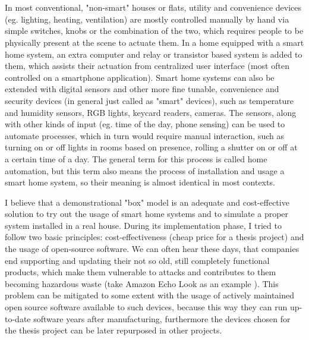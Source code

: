 \chapter{\bevezetes}

In most conventional, "non-smart" houses or flats, utility and convenience devices (eg. lighting, heating, ventilation) are mostly controlled manually by hand via simple switches, knobs or the combination of the two, which requires people to be physically present at the scene to actuate them. In a home equipped with a smart home system, an extra computer and relay or transistor based system is added to them, which assists their actuation from centralized user interface (most often controlled on a smartphone application). Smart home systems can also be extended with digital sensors and other more fine tunable, convenience and security devices (in general just called as "smart" devices), such as temperature and humidity sensors, RGB lights, keycard readers, cameras. The sensors, along with other kinds of input (eg. time of the day, phone sensing) can be used to automate processes, which in turn would require manual interaction, such as turning on or off lights in rooms based on presence, rolling a shutter on or off at a certain time of a day. The general term for this process is called home automation, but this term also means the process of installation and usage a smart home system, so their meaning is almost identical in most contexts.

I believe that a demonstrational "box" model is an adequate and cost-effective solution to try out the usage of smart home systems and to simulate a proper system installed in a real house. During its implementation phase, I tried to follow two basic principles: cost-effectiveness (cheap price for a thesis project) and the usage of open-source software. We can often hear these days, that companies end supporting and updating their not so old, still completely functional products, which make them vulnerable to attacks and contributes to them becoming hazardous waste (take Amazon Echo Look as an example \cite{VergeAmazonEchoLook}). This problem can be mitigated to some extent with the usage of actively maintained open source software available to such devices, because this way they can run up-to-date software years after manufacturing, furthermore the devices chosen for the thesis project can be later repurposed in other projects.

